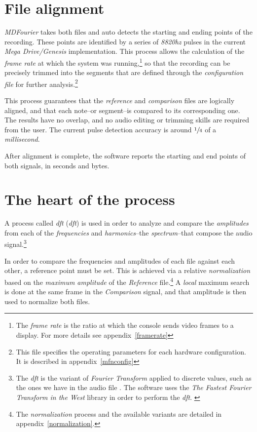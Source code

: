 \documentclass[10pt,a4paper]{report}
\newcommand{\define}[1]{\textit{\acrlong{#1}} (\textit{\acrshort{#1}})}
\newcommand{\ac}[1]{\textit{\mbox{\acrshort{#1}}}}
\newcommand{\hz}[1]{\textit{\mbox{#1\acrshort{hz}}}}
\begin{document}
\section{File alignment}

\textit{MDFourier} takes both files and auto detects the starting and ending points of the recording. These points are identified by a series of \hz{8820} pulses in the current \textit{Mega Drive/Genesis} implementation. This process allows the calculation of the \textit{frame rate} at which the system was running,\footnote{The \textit{frame rate} is the ratio at which the console sends video frames to a display. For more details see appendix~\ref{framerate}} so that the recording can be precisely trimmed into the segments that are defined through the \textit{configuration file} for further analysis.\footnote{This file specifies the operating parameters for each hardware configuration. It is described in appendix~\ref{mfnconfig}}

This process guarantees that the \textit{reference} and \textit{comparison} files are logically aligned, and that each note--or segment--is compared to its corresponding one. The results have no overlap, and no audio editing or trimming skills are required from the user. The current pulse detection accuracy is around $\sfrac{1}{4}$ of a \textit{millisecond}.

After alignment is complete, the software reports the starting and end points of both signals, in seconds and bytes.

\section{The heart of the process}

A process called \define{dft} is used in order to analyze and compare the \textit{amplitudes} from each of the \textit{frequencies} and \textit{harmonics}--the \textit{spectrum}--that compose the audio signal.\footnote{The \ac{dft} is the variant of \textit{Fourier Transform} applied to discrete values, such as the ones we have in the audio file \cite{FourierTransformApps}. The software uses the \textit{The Fastest Fourier Transform in the West} library in order to perform the \ac{dft}. \cite{fftw}}

In order to compare the frequencies and amplitudes of each file against each other, a reference point must be set. This is achieved via a relative \textit{normalization} based on the \textit{maximum amplitude} of the \textit{Reference} file.\footnote{The \textit{normalization} process and the available variants are detailed in appendix~\ref{normalization}.} A \textit{local} maximum search is done at the same frame in the \textit{Comparison} signal, and that amplitude is then used to normalize both files. 
\end{document}
